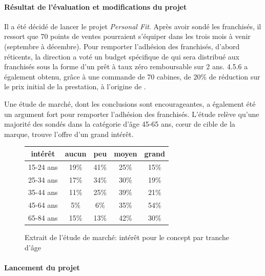 \documentclass[12pt]{article}
\begin{document}
\paragraph{Résultat de l'évaluation et modifications du projet}
\noindent 
Il a été décidé de lancer le projet \textit{Personal Fit}. Après avoir sondé 
les franchisés, il ressort que 70 points de ventes pourraient s'équiper dans 
les trois mois à venir (septembre à décembre). Pour remporter l'adhésion des
franchisés, d'abord réticents, la direction a voté un budget spécifique de 
 qui sera distribué aux franchisés sous la forme d'un prêt à taux 
zéro remboursable sur 2 ans.
4.5.6 a également obtenu, grâce à une commande de 70 cabines, de 20\% de réduction
sur le prix initial de la prestation, à l'origine de .

Une étude de marché, dont les conclusions sont encourageantes, a également été
un argument fort pour remporter l'adhésion des franchisés. L'étude relève qu'une
majorité des sondés dans la catégorie d'âge 45-65 ans, c{\oe}ur de cible de la
marque, trouve l'offre d'un grand intérêt.

\begin{figure}
\begin{center}
\begin{tabular}{|c|c|c|c|c|}
\hline
intérêt	&	aucun  & peu  &  moyen 	& grand \\
\hline
15-24 ans	&	19\%	&  41\% &  25\%	& 15\% \\
25-34 ans	&	17\%	&  34\% &  30\%	& 19\% \\
35-44 ans	&	11\%	&  25\% &  39\%	& 21\% \\
45-64 ans	&	5\%	&  6\% &   35\%	& 54\% \\
65-84 ans	&	15\%	&  13\% &  42\%	& 30\% \\
\hline
\end{tabular}
\caption{Extrait de l'étude de marché: intérêt pour le concept par tranche d'âge}
\end{center}
\end{figure}




\paragraph{Lancement du projet}
\end{document}
